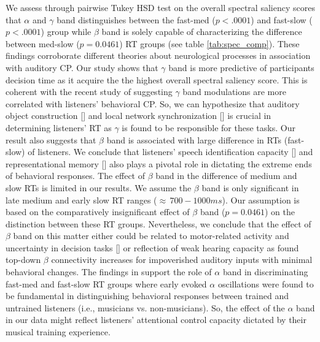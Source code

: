\documentclass{article}
\begin{document}
We assess through pairwise Tukey HSD test on the overall spectral saliency scores that $\alpha$ and $\gamma$ band distinguishes between the fast-med ($p < .0001$) and fast-slow ($p < .0001$) group while $\beta$ band is solely capable of characterizing the difference between med-slow ($p = 0.0461$) RT groups (see table \ref{tab:spec_comp}). These findings corroborate different theories about neurological processes in association with auditory CP. Our study shows that $\gamma$ band is more predictive of participants decision time as it acquire the the highest overall spectral saliency score. This is coherent with the recent study of \cite{Mahmud2020} suggesting $\gamma$ band modulations are more correlated with listeners' behavioral CP. So, we can hypothesize that auditory object construction [\cite{obj_con_gamma}] and local network synchronization [\cite{net_gamma1, net_gamma2, net_gamma3}] is crucial in determining listeners' RT as $\gamma$ is found to be responsible for these tasks. Our result also suggests that $\beta$ band is associated with large difference in RTs (fast-slow) of listeners. We conclude that listeners' speech identification capacity [\cite{beta1}] and representational memory [\cite{beta2}] also plays a pivotal role in dictating the extreme ends of behavioral responses. The effect of $\beta$ band in the difference of medium and slow RTs is limited in our results. We assume the $\beta$ band is only significant in late medium and early slow RT ranges ($\approx \, 700 - 1000 ms$). Our assumption is based on the comparatively insignificant effect of $\beta$ band ($p = 0.0461$) on the distinction between these RT groups. Nevertheless, we conclude that the effect of $\beta$ band on this matter either could be related to motor-related activity and uncertainty in decision tasks [\cite{beta3, beta4}] or reflection of weak hearing capacity as \cite{beta5} found top-down $\beta$ connectivity increases for impoverished auditory inputs with minimal behavioral changes. The findings in \cite{alpha} support the role of $\alpha$ band in discriminating fast-med and fast-slow RT groups where early evoked $\alpha$ oscillations were found to be fundamental in distinguishing behavioral responses between trained and untrained listeners (i.e., musicians vs. non-musicians). So, the effect of the $\alpha$ band in our data might reflect listeners' attentional control capacity dictated by their musical training experience.
\end{document}
